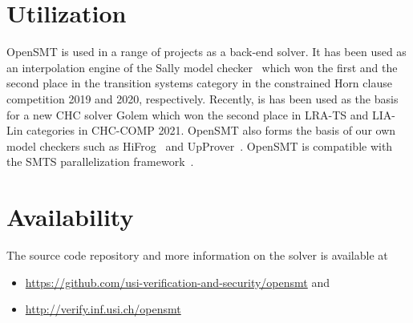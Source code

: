 \documentclass{easychair}
\begin{document}
\section{Utilization}

OpenSMT is used in a range of projects as a back-end solver.  It has been used as an interpolation engine of the Sally model
checker~\cite{JovanovicD:FMCAD16} which won the first and the second place in the transition systems category in the constrained Horn clause competition 2019 and 2020, respectively.
Recently, is has been used as the basis for a new CHC solver Golem which won the second place in LRA-TS and LIA-Lin categories in CHC-COMP 2021.
OpenSMT also forms the basis of our own model checkers such as
HiFrog~\cite{AltACMFHS17} and UpProver~\cite{Asadi_2020b}.
OpenSMT is compatible with the SMTS parallelization framework~\cite{MarescottiHS18}.

\section{Availability}
The source code repository and more information on the solver is
available at

\begin{itemize}
    \item \url{https://github.com/usi-verification-and-security/opensmt}
        and
    \item \url{http://verify.inf.usi.ch/opensmt}
\end{itemize}

\iffalse
in chronological order, work on interpolation 
algorithms~\cite{BlichaHKS19,AltHAS17,JancikAFHKS16,AsadiBFHESC18}
and parallel SMT 
solving~\cite{HyvarinenMSCS18,MarescottiHS18,HyvarinenMS:SAT15}.
OpenSMT2 is
used as the back-end in model-checking tools
HiFrog~\cite{AltACMFHS17},
eVolCheck~\cite{FSS_TACAS13}, 
FunFrog~\cite{SFS_ATVA12}, and
PeRIPLO~\cite{RolliniAFHS:LPAR2013,AltFHS:VSTTE2015}.
OpenSMT2 is a supported engine in the parallel 
solving framework SMTS~\cite{MarescottiHS16}.

\section{Acknowledgements}
We thank everyone who helped
developing OpenSMT2. In particular,
Leonardo Alt,
Sepideh Asadi,
Martin Blicha,
Roberto Bruttomesso,
Antti E. J. Hyv{\"a}rinen,
Matteo Marescotti,
Edgar Pek,
Simone Fulvio Rollini, 
Parvin Sadigova,
Natasha Sharygina,
Aliaksei Tsitovich.
\fi



\end{document}
